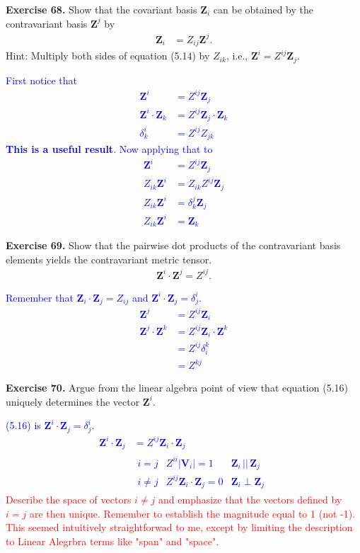 \documentclass[12pt,a4paper]{report}
\newcommand{\RED}[1]{\textcolor{red}{#1}}
\newcommand{\BLUE}[1]{\textcolor{blue}{#1}}
\newcommand{\VK}[1]{\textbf{#1}}
\begin{document}
\begin{description}
\item \textbf{Exercise 68.}  Show that the covariant basis $\VK{Z}_i$ can be obtained by the contravariant basis $\VK{Z}^j$ by 
\begin{align*}
	\VK{Z}_i &= Z_{ij}\VK{Z}^j.
\end{align*}Hint: Multiply both sides of equation (5.14) by $Z_{ik}$, i.e., $\VK{Z}^i = Z^{ij}\VK{Z}_j$.

\BLUE{First notice that
\begin{align*}
	\VK{Z}^i &= Z^{ij}\VK{Z}_j \\
	\VK{Z}^i\cdot\VK{Z}_k &= Z^{ij}\VK{Z}_j\cdot\VK{Z}_k \\
	\delta^i_k &= Z^{ij}Z_{jk}
\end{align*}\textbf{This is a useful result}.  Now applying that to
\begin{align*}
	\VK{Z}^i &= Z^{ij}\VK{Z}_j \\
	Z_{ik}\VK{Z}^i &= Z_{ik}Z^{ij}\VK{Z}_j \\
	Z_{ik}\VK{Z}^i &= \delta^j_k\VK{Z}_j \\
	Z_{ik}\VK{Z}^i &= \VK{Z}_k
\end{align*}
}

\item \textbf{Exercise 69.} Show that the pairwise dot products of the contravariant basis elements yields the contravariant metric tensor.
\begin{align*}
	\VK{Z}^i\cdot \VK{Z}^j = Z^{ij}.
\end{align*}

\BLUE{Remember that $\VK{Z}_i\cdot\VK{Z}_j = Z_{ij}$ and $\VK{Z}^i\cdot\VK{Z}_j = \delta^i_j$.
\begin{align*}
	\VK{Z}^j &= Z^{ij}\VK{Z}_i \\
	\VK{Z}^j\cdot \VK{Z}^k &= Z^{ij}\VK{Z}_i \cdot \VK{Z}^k \\
	&= Z^{ij}\delta^k_i \\
	&= Z^{kj}
\end{align*}
}

\item \textbf{Exercise 70.}  Argue from the linear algebra point of view that equation (5.16) uniquely determines the vector $\VK{Z}^i$.

\BLUE{(5.16) is $\VK{Z}^i\cdot\VK{Z}_j=\delta^i_j$.
\begin{align*}
	\VK{Z}^i\cdot\VK{Z}_j &= Z^{ij}\VK{Z}_i\cdot\VK{Z}_j \\
	&\begin{array}{lcl}
		i=j & Z^{ii}|\VK{V}_i|=1 & \VK{Z}_i\,||\,\VK{Z}_j \\
		i\ne j & Z^{ij}\VK{Z}_i\cdot\VK{Z}_j=0 & \VK{Z}_i\perp\VK{Z}_j
	\end{array}
\end{align*}}
\RED{Describe the space of vectors $i\ne j$ and emphasize that the vectors defined by $i=j$ are then unique.  Remember to establish the magnitude equal to 1 (not -1).  This seemed intuitively straightforwad to me, except by limiting the description to Linear Alegrbra terms like "span" and "space".}


\end{description}
\end{document}
